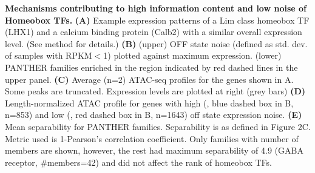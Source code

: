 \textbf{Mechanisms contributing to high information content and low noise of Homeobox TFs.}
\textbf{(A)} Example expression patterns of a Lim class homeobox TF (LHX1) and a calcium binding protein (Calb2) with a similar overall expression level. 
(See method for details.)
\textbf{(B)} (upper) OFF state noise (defined as std. dev. of samples with RPKM$<$1) plotted against maximum expression. (lower) PANTHER families enriched in the region indicated by red dashed lines in the upper panel.
\textbf{(C)} Average (n=2) ATAC-seq profiles for the genes shown in A. Some peaks are truncated. Expression levels are plotted at right (grey bars)
\textbf{(D)} Length-normalized ATAC profile for genes with high (, blue dashed box in B, n=853) and low (, red dashed box in B, n=1643) off state expression noise.
\textbf{(E)} Mean separability for PANTHER families. Separability is as defined in Figure 2C. Metric used is 1-Pearson's correlation coefficient. Only families with number of members  are shown, however, the rest had maximum separability of 4.9 (GABA receptor, #members=42) and did not affect the rank of homeobox TFs. 

